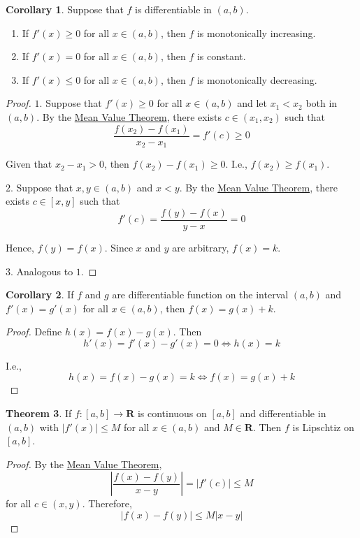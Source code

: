 \documentclass[tikz,12pt,a4paper]{article}
\theoremstyle{definition}
\newtheorem{theorem}{Theorem}[section]
\newtheorem{corollary}[theorem]{Corollary}
\begin{document}
\begin{corollary}
	Suppose that $f$ is differentiable in $(a,b)$.
	\begin{enumerate}
		\item If $f'(x) \geq 0$ for all $x \in (a,b)$, then $f$ is monotonically increasing.
		\item If $f'(x) = 0$ for all $x \in (a,b)$, then $f$ is constant.
		\item If $f'(x) \leq 0$ for all $x \in (a,b)$, then $f$ is monotonically decreasing.
	\end{enumerate}
\end{corollary}

\begin{proof}
	$1.$ Suppose that $f'(x) \geq 0$ for all $x \in (a,b)$ and let $x_1 < x_2$ both in $(a,b)$. By the \hyperref[thm:mean-value]{Mean Value Theorem}, there exists $c \in (x_1, x_2)$ such that
	\[
		\frac{f(x_2) - f(x_1)}{x_2 - x_1} = f'(c) \geq 0
	\]
	
	Given that $x_2 - x_1 > 0$, then $f(x_2) - f(x_1) \geq 0$. I.e., $f(x_2) \geq f(x_1)$.
	
	$2.$ Suppose that $x,y \in (a,b)$ and $x < y$. By the \hyperref[thm:mean-value]{Mean Value Theorem}, there exists $c \in [x,y]$ such that
	\[
		f'(c) = \frac{f(y) - f(x)}{y-x} = 0
	\]
	
	Hence, $f(y) = f(x)$. Since $x$ and $y$ are arbitrary, $f(x) = k$.
	
	$3.$ Analogous to $1.$
\end{proof}

\begin{corollary}
	If $f$ and $g$ are differentiable function on the interval $(a,b)$ and $f'(x) = g'(x)$ for all $x \in (a,b)$, then $f(x) = g(x) + k$.
\end{corollary}

\begin{proof}
	Define $h(x) = f(x) - g(x)$. Then
	\[
		h'(x) = f'(x) - g'(x) = 0 \iff h(x) = k
	\]
	
	I.e.,
	\[
		h(x) = f(x) - g(x) = k \iff f(x) = g(x) + k
	\]
\end{proof}

\begin{theorem}
	If $f : [a,b] \longrightarrow \textbf{R}$ is continuous on $[a,b]$ and differentiable in $(a,b)$ with $|f'(x)| \leq M$ for all $x \in (a,b)$ and $M \in \textbf{R}$. Then $f$ is Lipschtiz on $[a,b]$.
\end{theorem}

\begin{proof}
	By the \hyperref[thm:mean-value]{Mean Value Theorem},
	\[
		\left| \frac{f(x) - f(y)}{x-y} \right| = |f'(c)| \leq M
	\]
	for all $c \in (x,y)$. Therefore,
	\[
		|f(x) - f(y)| \leq M |x-y|
	\]
\end{proof}
\end{document}
